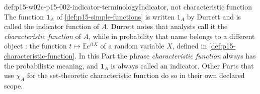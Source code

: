 \begin{hbwarning}{def:p15-w02c-p15-002-indicator-terminology}{Indicator, not characteristic function}
The function \(\mathbf1_A\) of \cref{def:p15-simple-functions} is written
\(1_A\) by Durrett and is called the indicator function of \(A\). Durrett
notes that analysts call it the \emph{characteristic function} of \(A\),
while in probability that name belongs to a different object
\cite[p.~10]{DurrettPTEAuthor2019}: the function
\(t\mapsto\mathbb E e^{itX}\) of a random variable \(X\), defined in
\cref{def:p15-characteristic-function}. In this Part the phrase
\emph{characteristic function} always has the probabilistic meaning, and
\(\mathbf1_A\) is always called an indicator. Other Parts that use
\(\chi_A\) for the set-theoretic characteristic function do so in their
own declared scope.
\end{hbwarning}

